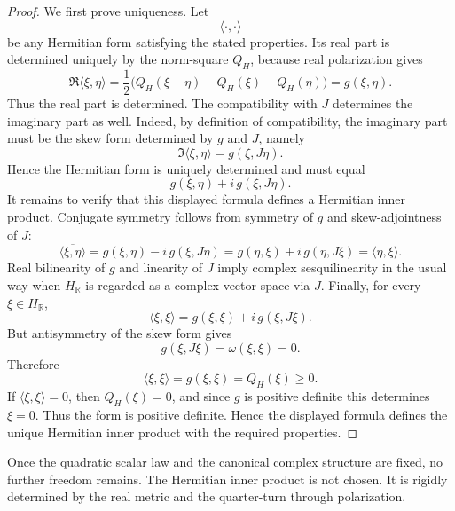 \begin{proof}
	We first prove uniqueness.
	Let
	\[
		\langle\cdot,\cdot\rangle
	\]
	be any Hermitian form satisfying the stated properties.
	Its real part is determined uniquely by the norm-square \(Q_H\), because
	real polarization gives
	\[
		\Re\langle \xi,\eta\rangle
		=
		\frac12\bigl(Q_H(\xi+\eta)-Q_H(\xi)-Q_H(\eta)\bigr)
		=
		g(\xi,\eta).
	\]
	Thus the real part is determined.
	The compatibility with \(J\) determines the imaginary part as well.
	Indeed, by definition of compatibility, the imaginary part must be the
	skew form determined by \(g\) and \(J\), namely
	\[
		\Im\langle \xi,\eta\rangle
		=
		g(\xi,J\eta).
	\]
	Hence the Hermitian form is uniquely determined and must equal
	\[
		g(\xi,\eta)+i\,g(\xi,J\eta).
	\]
	It remains to verify that this displayed formula defines a Hermitian
	inner product.
	Conjugate symmetry follows from symmetry of \(g\) and skew-adjointness
	of \(J\):
	\[
		\overline{\langle \xi,\eta\rangle}
		=
		g(\xi,\eta)-i\,g(\xi,J\eta)
		=
		g(\eta,\xi)+i\,g(\eta,J\xi)
		=
		\langle \eta,\xi\rangle.
	\]
	Real bilinearity of \(g\) and linearity of \(J\) imply complex
	sesquilinearity in the usual way when \(H_{\mathbb R}\) is regarded as a
	complex vector space via \(J\).
	Finally, for every \(\xi\in H_{\mathbb R}\),
	\[
		\langle \xi,\xi\rangle
		=
		g(\xi,\xi)+i\,g(\xi,J\xi).
	\]
	But antisymmetry of the skew form gives
	\[
		g(\xi,J\xi)=\omega(\xi,\xi)=0.
	\]
	Therefore
	\[
		\langle \xi,\xi\rangle
		=
		g(\xi,\xi)
		=
		Q_H(\xi)\ge 0.
	\]
	If \(\langle \xi,\xi\rangle=0\), then \(Q_H(\xi)=0\), and since \(g\) is
	positive definite this determines \(\xi=0\).
	Thus the form is positive definite.
	Hence the displayed formula defines the unique Hermitian inner product
	with the required properties.
\end{proof}
\begin{remark}
	Once the quadratic scalar law and the canonical complex structure are
	fixed, no further freedom remains.
	The Hermitian inner product is not chosen.
	It is rigidly determined by the real metric and the quarter-turn through
	polarization.
\end{remark}
